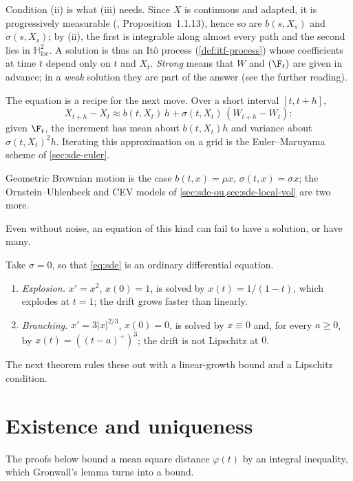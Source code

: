 Condition (ii) is what (iii) needs. Since $X$ is continuous and adapted, it is
progressively measurable (\textcite{karatzas-shreve}, Proposition~1.1.13), hence so are
$b(s,X_s)$ and $\sigma(s,X_s)$; by (ii), the first is integrable along almost every path and
the second lies in $\mathbb H^2_{\mathrm{loc}}$. A solution is thus an It\^o process
(\cref{def:itf-process}) whose coefficients at time $t$ depend only on $t$ and $X_t$.
\emph{Strong} means that $W$ and $(\F_t)$ are given in advance; in a \emph{weak} solution
they are part of the answer (see the further reading).

The equation is a recipe for the next move. Over a short interval $[t,t+h]$,
\[
  X_{t+h}-X_t\approx b(t,X_t)\,h+\sigma(t,X_t)\,(W_{t+h}-W_t):
\]
given $\F_t$, the increment has mean about $b(t,X_t)h$ and variance about
$\sigma(t,X_t)^2h$. Iterating this approximation on a grid is the Euler--Maruyama scheme of
\cref{sec:sde-euler}.

Geometric Brownian motion is the case $b(t,x)=\mu x$, $\sigma(t,x)=\sigma x$; the
Ornstein--Uhlenbeck and CEV models of \cref{sec:sde-ou,sec:sde-local-vol} are two more.

Even without noise, an equation of this kind can fail to have a solution, or have many.

\begin{example}\label{exa:sde-failures}
Take $\sigma=0$, so that \eqref{eq:sde} is an ordinary differential equation.
\begin{enumerate}[label=(\alph*)]
  \item \emph{Explosion.} $x'=x^2$, $x(0)=1$, is solved by $x(t)=1/(1-t)$, which explodes
    at $t=1$; the drift grows faster than linearly.
  \item \emph{Branching.} $x'=3|x|^{2/3}$, $x(0)=0$, is solved by $x\equiv0$ and, for every
    $a\ge0$, by $x(t)=((t-a)^+)^3$; the drift is not Lipschitz at $0$.
\end{enumerate}
The next theorem rules these out with a linear-growth bound and a Lipschitz condition.
\end{example}

\section{Existence and uniqueness}\label{sec:sde-existence}

The proofs below bound a mean square distance $\varphi(t)$ by an integral inequality, which
Gronwall's lemma turns into a bound.

